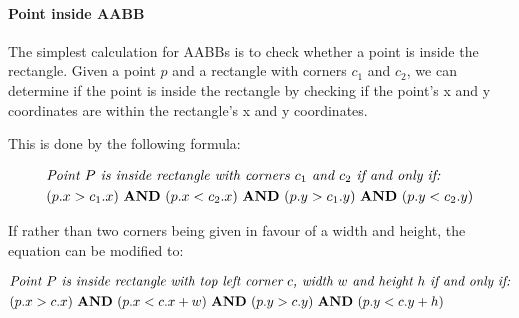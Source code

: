 \documentclass[10pt,a4paper]{article}
\renewcommand{\land}{\,\,\textrm{\textbf{AND}}\,\,}
\begin{document}
\paragraph*{Point inside AABB}

The simplest calculation for AABBs is to check whether a point is inside the
rectangle. Given a point $p$ and a rectangle with corners $c_1$ and $c_2$, we
can determine if the point is inside the rectangle by checking if the point's x
and y coordinates are within the rectangle's x and y coordinates.

This is done by the following formula:

\begin{equation}
    \begin{aligned}
         & \textit{Point $P$ is inside rectangle with corners $c_1$ and $c_2$ if and only if:} \\
         & (p.x > c_1.x) \land (p.x < c_2.x) \land (p.y > c_1.y) \land (p.y < c_2.y)
    \end{aligned}
\end{equation}

If rather than two corners being given in favour of a width and height, the
equation can be modified to:

\begin{equation}
    \begin{aligned}
         & \textit{Point $P$ is inside rectangle with top left corner $c$, width $w$ and height $h$ if and only if:} \\
         & (p.x > c.x) \land (p.x < c.x + w) \land (p.y > c.y) \land (p.y < c.y + h)
    \end{aligned}
\end{equation}
\end{document}
